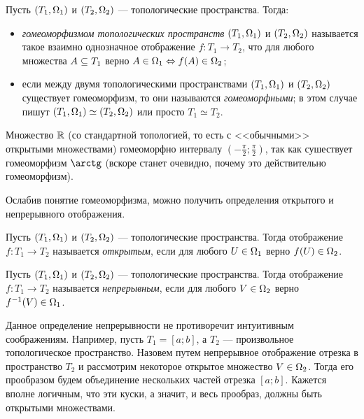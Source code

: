 \documentclass[main]{subfiles}
\begin{document}
\begin{definition}
	Пусть $ (T_1, \Omega_1) $ и $ (T_2, \Omega_2) $ --- топологические пространства. Тогда:
	\begin{itemize}
		\item \emph{гомеоморфизмом топологических пространств} $ (T_1, \Omega_1) $ и $ (T_2, \Omega_2) $ называется такое
			взаимно однозначное отображение $ f \colon T_1 \to T_2 $, что для любого множества $ A \subseteq T_1 $ верно
			$ A \in \Omega_1 \Leftrightarrow f(A) \in \Omega_2 $;
		\item если между двумя топологическими пространствами $ (T_1, \Omega_1) $ и $ (T_2, \Omega_2) $ существует
			гомеоморфизм, то они называются \emph{гомеоморфными}; в этом случае пишут
			$ (T_1, \Omega_1 ) \simeq (T_2, \Omega_2) $ или просто $ T_1 \simeq T_2 $.
	\end{itemize}
\end{definition}

\begin{example}
	Множество $ \mathbb{R} $ (со стандартной топологией, то есть с <<обычными>> открытыми множествами) гомеоморфно
	интервалу $ \left( -\frac{\pi}{2}; \frac{\pi}{2} \right) $, так как сушествует гомеоморфизм $ \arctg $
	(вскоре станет очевидно, почему это действительно гомеоморфизм).
\end{example}

Ослабив понятие гомеоморфизма, можно получить определения открытого и непрерывного отображения.

\begin{definition}
	Пусть $ (T_1, \Omega_1) $ и $ (T_2, \Omega_2) $ --- топологические пространства. Тогда отображение
	$ f \colon T_1 \to T_2 $ называется \emph{открытым}, если для любого $ U \in \Omega_1 $ верно $ f(U) \in \Omega_2 $.
\end{definition}

\begin{definition}
	Пусть $ (T_1, \Omega_1) $ и $ (T_2, \Omega_2) $ --- топологические пространства. Тогда отображение
	$ f \colon T_1 \to T_2 $ называется \emph{непрерывным}, если для любого $ V \in \Omega_2 $ верно
	$ f^{-1}(V) \in \Omega_1 $.
\end{definition}

\begin{remark}
	Данное определение непрерывности не противоречит интуитивным соображениям. Например,
	пусть $ T_1 = [a; b] $, а $ T_2 $ --- произвольное топологическое пространство. Назовем путем непрерывное
	отображение отрезка в пространство $ T_2 $ и рассмотрим некоторое открытое множество $ V \in \Omega_2 $. Тогда его
	прообразом будем объединение нескольких частей отрезка $ [a; b] $. Кажется вполне логичным, что эти куски,
	а значит, и весь прообраз, должны быть открытыми множествами.
\end{remark}
\end{document}

